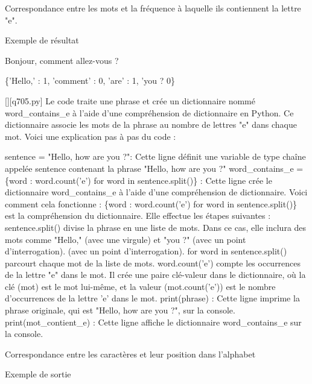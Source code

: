         \question
        Correspondance entre les mots et la fréquence à laquelle ils contiennent la lettre "e".

Exemple de résultat

Bonjour, comment allez-vous ?

\{'Hello,' : 1, 'comment' : 0, 'are' : 1, 'you ? 0\}
        \par
        \begin{solution}
            \renewcommand{\nomfichier}{q705.py}
            \pythonfile{\chemincode \nomfichier}[][\nomfichier]
            Le code traite une phrase et crée un dictionnaire nommé word\_contains\_e à l'aide d'une compréhension de dictionnaire en Python. Ce dictionnaire associe les mots de la phrase au nombre de lettres "e" dans chaque mot. Voici une explication pas à pas du code :

    sentence = "Hello, how are you ?": Cette ligne définit une variable de type chaîne appelée sentence contenant la phrase "Hello, how are you ?"
    word\_contains\_e = \{word : word.count('e') for word in sentence.split()\} : Cette ligne crée le dictionnaire word\_contains\_e à l'aide d'une compréhension de dictionnaire. Voici comment cela fonctionne :
        \{word : word.count('e') for word in sentence.split()\} est la compréhension du dictionnaire. Elle effectue les étapes suivantes :
        sentence.split() divise la phrase en une liste de mots. Dans ce cas, elle inclura des mots comme "Hello," (avec une virgule) et "you ?" (avec un point d'interrogation). (avec un point d'interrogation).
        for word in sentence.split() parcourt chaque mot de la liste de mots.
        word.count('e') compte les occurrences de la lettre "e" dans le mot.
        Il crée une paire clé-valeur dans le dictionnaire, où la clé (mot) est le mot lui-même, et la valeur (mot.count('e')) est le nombre d'occurrences de la lettre 'e' dans le mot.
    print(phrase) : Cette ligne imprime la phrase originale, qui est "Hello, how are you ?", sur la console.
    print(mot\_contient\_e) : Cette ligne affiche le dictionnaire word\_contains\_e sur la console.
        \end{solution}
        

        \question
        Correspondance entre les caractères et leur position dans l'alphabet

Exemple de sortie


